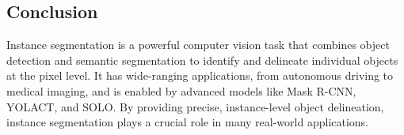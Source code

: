 \begin{notechapter}
\section{Conclusion}
Instance segmentation is a powerful computer vision task that combines 
object detection and semantic segmentation to identify and delineate 
individual objects at the pixel level. It has wide-ranging 
applications, from autonomous driving to medical imaging, and is 
enabled by advanced models like Mask R-CNN, YOLACT, and SOLO. By 
providing precise, instance-level object delineation, instance 
segmentation plays a crucial role in many real-world applications.
\end{notechapter}
